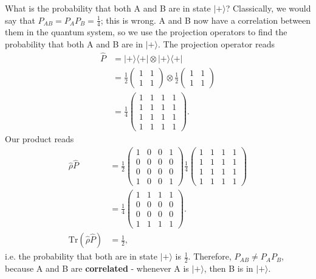 \documentclass[lasers.tex]{subfiles}
\begin{document}
\begin{example}
    What is the probability that both A and B are in state $|+\rangle$?
    Classically, we would say that $P_{AB}=P_AP_B=\frac14$; this is wrong. 
    A and B now have a correlation between them in the quantum system, so we use the projection operators to find the probability that both A and B are in $|+\rangle$.
    The projection operator reads
    \begin{align}
        \hat{P} &= |+\rangle\langle+| \otimes |+\rangle\langle+| \\
                &= \frac12\begin{pmatrix}1 & 1 \\ 1 & 1\end{pmatrix} \otimes \frac12\begin{pmatrix}1 & 1 \\ 1 & 1\end{pmatrix} \\
                &= \frac14\begin{pmatrix} 1&1&1&1\\1&1&1&1\\1&1&1&1\\1&1&1&1\end{pmatrix}.
    \end{align}
    Our product reads
    \begin{align}
        \hat{\rho}\hat{P} &= \frac12 \begin{pmatrix} 1 & 0 & 0 & 1 \\ 0 &0&0 & 0 \\ 0 & 0 & 0 & 0 \\ 1 & 0 & 0 & 1\end{pmatrix} \frac14\begin{pmatrix} 1&1&1&1\\1&1&1&1\\1&1&1&1\\1&1&1&1\end{pmatrix}\\
                          &= \frac14\begin{pmatrix} 1&1&1&1\\0&0&0&0\\0&0&0&0\\1&1&1&1\end{pmatrix}.\\
        \text{Tr}(\hat{\rho}\hat{P}) &= \frac12,
    \end{align}
    i.e. the probability that both are in state $|+\rangle$ is $\frac12$.
    Therefore, $P_{AB}\neq P_AP_B$, because A and B are \textbf{correlated} - whenever A is $|+\rangle$, then B is in $|+\rangle$.
\end{example}
\end{document}
